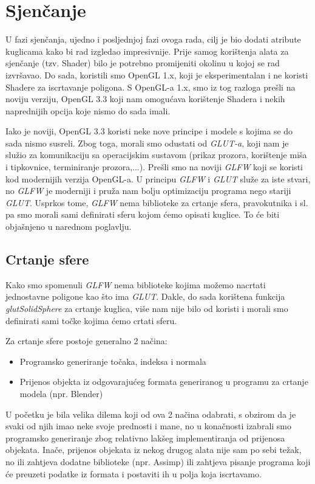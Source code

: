 \chapter{Sjenčanje}
U fazi sjenčanja, ujedno i posljednjoj fazi ovoga rada, cilj je bio dodati atribute kuglicama kako bi rad izgledao impresivnije. Prije samog korištenja alata za sjenčanje (tzv. Shader) bilo je potrebno promijeniti okolinu u kojoj se rad izvršavao. Do sada, koristili smo OpenGL 1.x, koji je eksperimentalan i ne koristi Shadere za iscrtavanje poligona. S OpenGL-a 1.x, smo iz tog razloga prešli na noviju verziju, OpenGL 3.3 koji nam omogućava korištenje Shadera i nekih naprednijih opcija koje nismo do sada imali.

Iako je noviji, OpenGL 3.3 koristi neke nove principe i modele s kojima se do sada nismo susreli. Zbog toga, morali smo odustati od \emph{GLUT-a}, koji nam je služio za komunikaciju sa operacijskim sustavom (prikaz prozora, korištenje miša i tipkovnice, terminiranje prozora,...). Prešli smo na noviji \emph{GLFW} koji se koristi kod modernijih verzija OpenGL-a. U principu \emph{GLFW} i \emph{GLUT} služe za iste stvari, no \emph{GLFW} je moderniji i pruža nam bolju optimizaciju programa nego stariji \emph{GLUT}. Usprkos tome, \emph{GLFW} nema biblioteke za crtanje sfera, pravokutnika i sl. pa smo morali sami definirati sferu kojom ćemo opisati kuglice. To će biti objašnjeno u narednom poglavlju.
\newpage
\section{Crtanje sfere}
Kako smo spomenuli \emph{GLFW} nema biblioteke kojima možemo nacrtati jednostavne poligone kao što ima \emph{GLUT}. Dakle, do sada korištena funkcija \emph{glutSolidSphere} za crtanje kuglica, više nam nije bilo od koristi i morali smo definirati sami točke kojima ćemo crtati sferu.

Za crtanje sfere postoje generalno 2 načina:
\begin{itemize}
	\item Programsko generiranje točaka, indeksa i normala
	\item Prijenos objekta iz odgovarajućeg formata generiranog u programu za crtanje modela (npr. Blender)
\end{itemize}
U početku je bila velika dilema koji od ova 2 načina odabrati, s obzirom da je svaki od njih imao neke svoje prednosti i mane, no u konačnosti izabrali smo programsko generiranje zbog relativno lakšeg implementiranja od prijenosa objekata. Inače, prijenos objekata iz nekog drugog alata nije sam po sebi težak, no ili zahtjeva dodatne biblioteke (npr. Assimp) ili zahtjeva pisanje programa koji će preuzeti podatke iz formata i postaviti ih u polja koja iscrtavamo.

